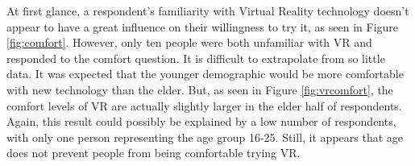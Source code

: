	At first glance, a respondent's familiarity with Virtual Reality technology doesn't appear to have a great influence on their willingness to try it, as seen in Figure \ref{fig:comfort}. However, only ten people were both unfamiliar with VR and responded to the comfort question. It is difficult to extrapolate from so little data. It was expected that the younger demographic would be more comfortable with new technology than the elder. But, as seen in Figure \ref{fig:vrcomfort}, the comfort levels of VR are actually slightly larger in the elder half of respondents. Again, this result could possibly be explained by a low number of respondents, with only one person representing the age group 16-25. Still, it appears that age does not prevent people from being comfortable trying VR.\\
	
